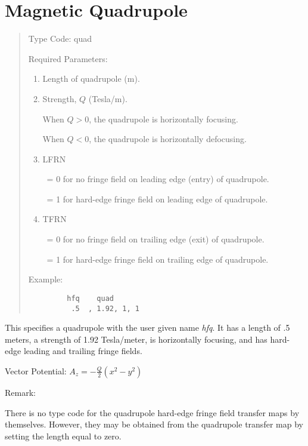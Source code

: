 \section{Magnetic Quadrupole}
\begin{quotation}
\noindent Type Code:  quad
\vspace{5mm}

\noindent Required Parameters:
\begin{enumerate}
      \item  Length of quadrupole (m).

      \item  Strength, $Q$ (Tesla/m).

             When $Q > 0$, the quadrupole is horizontally focusing.

             When $Q < 0$, the quadrupole is horizontally defocusing.

      \item  LFRN

             \ = 0 for no fringe field on leading edge (entry) of quadrupole.

             \ = 1 for hard-edge fringe field on leading edge of  quadrupole.

      \item  TFRN

             \ = 0 for no fringe field on trailing edge (exit) of quadrupole.

             \ = 1 for hard-edge fringe field on trailing edge of quadrupole.
\end{enumerate}

\vspace{5mm}
\noindent Example:
\begin{verbatim}
         hfq    quad
          .5  , 1.92, 1, 1
\end{verbatim}
\end{quotation}
This specifies a quadrupole with the user given name {\em hfq}.  It has a length
of .5 meters, a strength of 1.92 Tesla/meter, is horizontally focusing, and
has hard-edge leading and trailing fringe fields.

\vspace{5mm}
     Vector Potential:  $\displaystyle A_z = -\frac{Q}{2}(x^2-y^2)$

\vspace{5mm}
     Remark:
\vspace{2mm}

         There is no type code for the quadrupole hard-edge fringe field
transfer maps by themselves.  However, they may be obtained from the
quadrupole transfer map by setting the length equal to zero.

